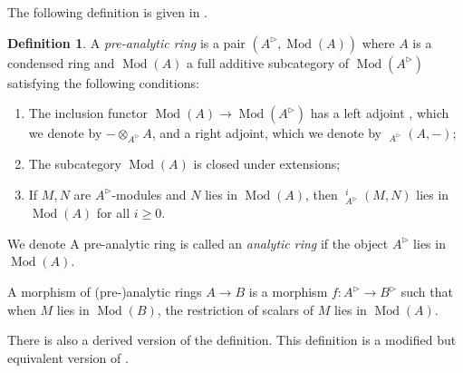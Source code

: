 \documentclass{article}
\theoremstyle{plain}
\theoremstyle{definition}
\newtheorem{defi}[thm]{Definition}
\theoremstyle{remark}
\DeclareMathOperator{\Homs}{\underline{Hom}}
\DeclareMathOperator{\modcat}{Mod}
\DeclareMathOperator{\exts}{\underline{Ext}}
\newcommand{\huflag}{\triangleright}
\begin{document}
The following definition is given in
\cite[\href{https://www.youtube.com/watch?v=dIwBTJNN7a0\&list=PLx5f8IelFRgGmu6gmL-Kf\_Rl\_6Mm7juZO\&index=8\&t=1633s}{Video 8, 27:13}]{ihesvid}.
\begin{defi}
A \emph{pre-analytic ring} is a pair $ (A ^{\huflag}, \modcat (A)) $ where $ A $ is a condensed ring and
$ \modcat (A) $ a full additive subcategory of $ \modcat (A ^{\huflag}) $ satisfying the following conditions:

\begin{enumerate}
\item The inclusion functor $ \modcat (A)\to \modcat (A ^{\huflag}) $ has a left adjoint
, which we denote by $ -\otimes _{A ^{\huflag}} A$, and a right adjoint, which we denote by $ \Homs _{A ^{\huflag}}(A, -) $;
\item The subcategory $ \modcat (A) $ is closed under extensions;
\item If $ M,N $ are $ A ^{\huflag} $-modules and $ N $ lies in $ \modcat (A) $,
then $ \exts ^{i} _{A ^{\huflag}} (M, N) $ lies in $ \modcat (A) $ for all $ i\geq 0 $.
\end{enumerate}
We denote
A pre-analytic ring is called an \emph{analytic ring} if the object $ A ^{\huflag} $ lies in $ \modcat (A) $.

A morphism of (pre-)analytic rings $ A\to B $ is a morphism $ f: A ^{\huflag}\to B ^{\huflag} $ such that
when $ M $ lies in $ \modcat (B) $, the restriction of scalars of $ M $ lies in $ \modcat (A) $.
\end{defi}

There is also a derived version of the definition.
This definition is a modified but equivalent version of \cite[\href
{https://www.youtube.com/watch?v=YxSZ1mTIpaA\&list=PLx5f8IelFRgGmu6gmL-Kf\_Rl\_6Mm7juZO\&t=3962s}{Video 1, 1:06:02}]{ihesvid}.
\end{document}
